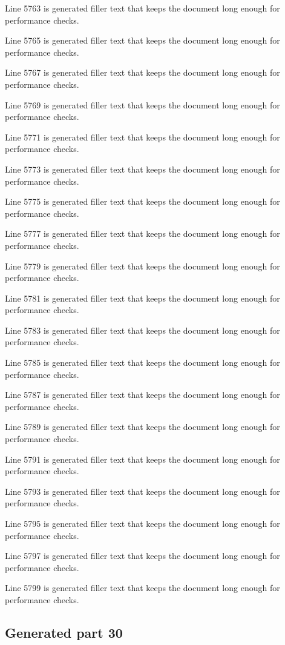Line 5763 is generated filler text that keeps the document long enough for performance checks.

Line 5765 is generated filler text that keeps the document long enough for performance checks.

Line 5767 is generated filler text that keeps the document long enough for performance checks.

Line 5769 is generated filler text that keeps the document long enough for performance checks.

Line 5771 is generated filler text that keeps the document long enough for performance checks.

Line 5773 is generated filler text that keeps the document long enough for performance checks.

Line 5775 is generated filler text that keeps the document long enough for performance checks.

Line 5777 is generated filler text that keeps the document long enough for performance checks.

Line 5779 is generated filler text that keeps the document long enough for performance checks.

Line 5781 is generated filler text that keeps the document long enough for performance checks.

Line 5783 is generated filler text that keeps the document long enough for performance checks.

Line 5785 is generated filler text that keeps the document long enough for performance checks.

Line 5787 is generated filler text that keeps the document long enough for performance checks.

Line 5789 is generated filler text that keeps the document long enough for performance checks.

Line 5791 is generated filler text that keeps the document long enough for performance checks.

Line 5793 is generated filler text that keeps the document long enough for performance checks.

Line 5795 is generated filler text that keeps the document long enough for performance checks.

Line 5797 is generated filler text that keeps the document long enough for performance checks.

Line 5799 is generated filler text that keeps the document long enough for performance checks.

\subsection{Generated part 30}

